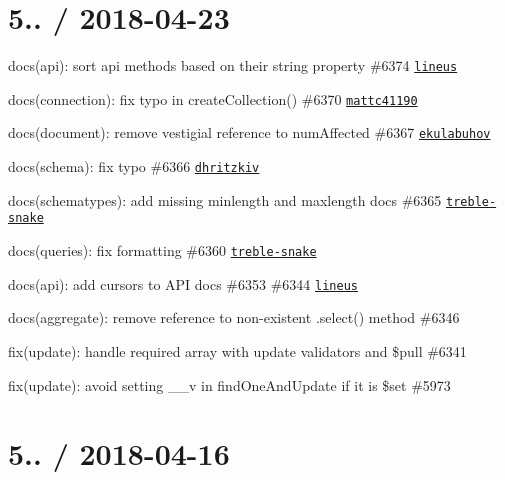 \section*{5.. / 2018-\/04-\/23 }


\begin{DoxyItemize}
\item docs(api)\+: sort api methods based on their string property \#6374 \href{https://github.com/lineus}{\tt lineus}
\item docs(connection)\+: fix typo in {\ttfamily create\+Collection()} \#6370 \href{https://github.com/mattc41190}{\tt mattc41190}
\item docs(document)\+: remove vestigial reference to {\ttfamily num\+Affected} \#6367 \href{https://github.com/ekulabuhov}{\tt ekulabuhov}
\item docs(schema)\+: fix typo \#6366 \href{https://github.com/dhritzkiv}{\tt dhritzkiv}
\item docs(schematypes)\+: add missing {\ttfamily minlength} and {\ttfamily maxlength} docs \#6365 \href{https://github.com/treble-snake}{\tt treble-\/snake}
\item docs(queries)\+: fix formatting \#6360 \href{https://github.com/treble-snake}{\tt treble-\/snake}
\item docs(api)\+: add cursors to A\+PI docs \#6353 \#6344 \href{https://github.com/lineus}{\tt lineus}
\item docs(aggregate)\+: remove reference to non-\/existent {\ttfamily .select()} method \#6346
\item fix(update)\+: handle {\ttfamily required} array with update validators and \$pull \#6341
\item fix(update)\+: avoid setting \+\_\+\+\_\+v in find\+One\+And\+Update if it is {\ttfamily \$set} \#5973
\end{DoxyItemize}

\section*{5.. / 2018-\/04-\/16 }


